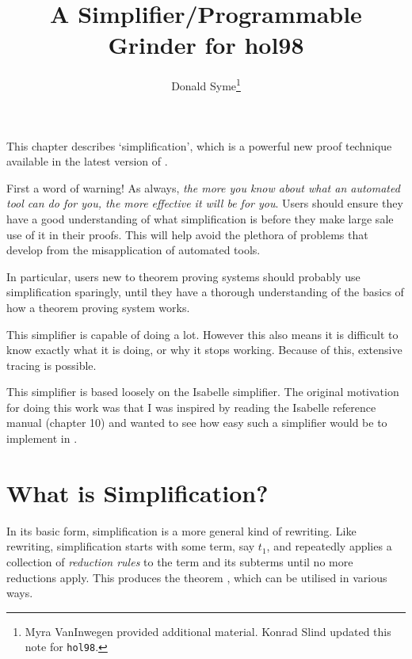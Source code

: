 

\title{A Simplifier/Programmable Grinder for hol98}
\author{Donald Syme\thanks{Myra VanInwegen provided additional
material. Konrad Slind updated this note for {\tt hol98}.}}





\maketitle

This chapter describes `simplification', which is a powerful new proof
technique available in the latest version of \HOL.

First a word of warning! As always, {\em the more you know about what an
  automated tool can do for you, the more effective it will be for
  you}. Users should ensure they have a good understanding of what
  simplification is before they make large sale use of it in their
  proofs.  This will help avoid the plethora of problems that develop
  from the misapplication of automated tools.

In particular, users new to theorem proving systems should probably
use simplification sparingly, until they have a thorough understanding
of the basics of how a theorem proving system works.

This simplifier is capable of doing a lot.  However this also means it
is difficult to know exactly what it is doing, or why it stops
working.  Because of this, extensive tracing is possible.

This simplifier is based loosely on the Isabelle simplifier.  The
original motivation for doing this work was that I was inspired by
reading the Isabelle reference manual (chapter 10) and wanted to see
how easy such a simplifier would be to implement in \HOL.

\section{What is Simplification?}

In its basic form, simplification is a more general kind of
rewriting. Like rewriting, simplification starts with some term, say
$t_1$, and repeatedly applies a collection of {\it reduction rules} to
the term and its subterms until no more reductions apply.  This produces
the theorem , which can be utilised in various
ways.

